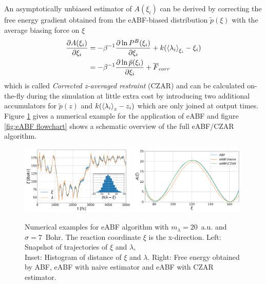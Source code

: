 An asymptotically unbiased estimator of $A(\xi_i)$ can be derived by correcting the free energy gradient obtained from the eABF-biased distribution $\tilde{p}(\xi)$ with the average biasing force on $\xi$
\begin{equation}
  \begin{split}
\frac{\partial A(\xi_i)}{\partial \xi_i} &= -\beta^{-1}\frac{\partial \ln P^B(\xi_i)}{\partial \xi_i} + k(\braket{\lambda_i}_{\xi_i}-\xi_{i}) \\
  &= -\beta^{-1}\frac{\partial \ln \tilde{p}(\xi_i)}{\partial \xi_i} + \overline{F}_{corr}
\end{split}
  \label{eq:CZAR}
\end{equation}
which is called \textit{Corrected z-averaged restraint} (CZAR)\autocite{lesage2017smoothed} and can be calculated on-the-fly during the simulation at little extra cost by introducing two additional accumulators for $\tilde{p}(z)$ and $k(\braket{\lambda_i}_{z}-z_{i})$ which are only joined at output times. Figure \ref{fig:eABF traj} gives a numerical example for the application of eABF and figure \ref{fig:eABF flowchart} shows a schematic overview of the full eABF/CZAR algorithm.

\begin{figure}[H]
    \centering
    \includegraphics[width=0.49\textwidth]{bilder/eABF_traj}
    \includegraphics[width=0.49\textwidth]{bilder/eABF_freeE}
    \caption{Numerical examples for eABF algorithm with $m_\lambda=20$~a.u. and $\sigma=7$~Bohr. The reaction coordinate $\xi$ is the x-direction. Left: Snapshot of trajectories of $\xi$ and $\lambda$, \\
    Inset: Histogram of distance of $\xi$ and $\lambda$. Right: Free energy obtained by ABF, eABF with naive estimator and eABF with CZAR estimator.}
\label{fig:eABF traj}%
\end{figure}

